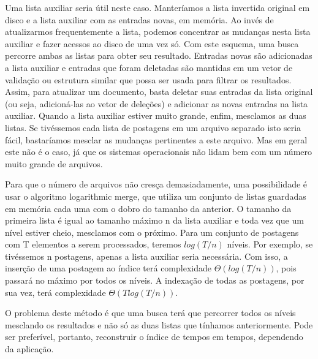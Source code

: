 Uma lista auxiliar seria útil neste caso. Manteríamos a lista invertida original em disco e a lista auxiliar com as entradas novas, em memória. Ao invés de atualizarmos frequentemente a lista, podemos concentrar as mudanças nesta lista auxiliar e fazer acessos ao disco de uma vez só. Com este esquema, uma busca percorre ambas as listas para obter seu resultado. Entradas novas são adicionadas a lista auxiliar e entradas que foram deletadas são mantidas em um vetor de validação ou estrutura similar que possa ser usada para filtrar os resultados. Assim, para atualizar um documento, basta deletar suas entradas da lista original (ou seja, adicioná-las ao vetor de deleções) e adicionar as novas entradas na lista auxiliar. Quando a lista auxiliar estiver muito grande, enfim, mesclamos as duas listas. Se tivéssemos cada lista de postagens em um arquivo separado isto seria fácil, bastaríamos mesclar as mudanças pertinentes a este arquivo. Mas em geral este não é o caso, já que os sistemas operacionais não lidam bem com um número muito grande de arquivos. 

Para que o número de arquivos não cresça demasiadamente, uma possibilidade é usar o algoritmo logarithmic merge, que utiliza um conjunto de listas guardadas em memória cada uma com o dobro do tamanho da anterior. O tamanho da primeira lista é igual ao tamanho máximo n da lista auxiliar e toda vez que um nível estiver cheio, mesclamos com o próximo. Para um conjunto de postagens com T elementos a serem processados, teremos $log( T/n )$ níveis. Por exemplo, se tivéssemos n postagens, apenas a lista auxiliar seria necessária. Com isso, a inserção de uma postagem ao índice terá complexidade $\Theta( log( T/n ))$, pois passará no máximo por todos os níveis. A indexação de todas as postagens, por sua vez, terá complexidade $\Theta( T log(T/n ))$.

O problema deste método é que uma busca terá que percorrer todos os níveis mesclando os resultados e não só as duas listas que tínhamos anteriormente. Pode ser preferível, portanto, reconstruir o índice de tempos em tempos, dependendo da aplicação.





